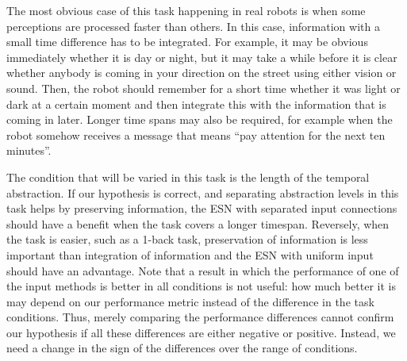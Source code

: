 \documentclass[10pt,a4paper]{report}
\begin{document}
The most obvious case of this task happening in real robots is when some perceptions are processed faster than others. In this case, information with a small time difference has to be integrated. For example, it may be obvious immediately whether it is day or night, but it may take a while before it is clear whether anybody is coming in your direction on the street using either vision or sound. Then, the robot should remember for a short time whether it was light or dark at a certain moment and then integrate this with the information that is coming in later. Longer time spans may also be required, for example when the robot somehow receives a message that means ``pay attention for the next ten minutes''.

The condition that will be varied in this task is the length of the temporal abstraction. If our hypothesis is correct, and separating abstraction levels in this task helps by preserving information, the ESN with separated input connections should have a benefit when the task covers a longer timespan. Reversely, when the task is easier, such as a 1-back task, preservation of information is less important than integration of information and the ESN with uniform input should have an advantage. Note that a result in which the performance of one of the input methods is better in all conditions is not useful: how much better it is may depend on our performance metric instead of the difference in the task conditions. Thus, merely comparing the performance differences cannot confirm our hypothesis if all these differences are either negative or positive. Instead, we need a change in the sign of the differences over the range of conditions.
\end{document}
